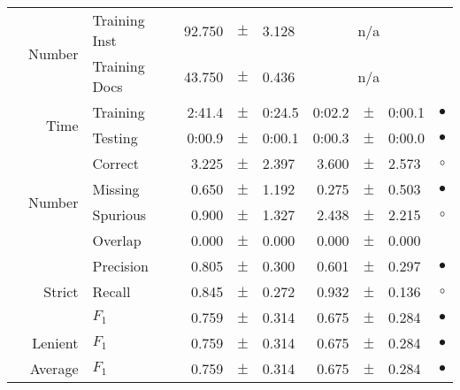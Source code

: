 \begin{longtable}{|r|r|l||rcl|rcl|c|}
\cline{2-10} & \multirow{2}{*}{    Number} &   Training Inst &      92.750 &  $\pm$  &       3.128 &    \multicolumn{3}{c|}{n/a}         &  \\
\cline{3-10} &                             &   Training Docs &      43.750 &  $\pm$  &       0.436 &    \multicolumn{3}{c|}{n/a}         &  \\
\cline{2-10} & \multirow{2}{*}{      Time} &        Training &      2:41.4 &  $\pm$  &      0:24.5 &      0:02.2 &  $\pm$  &      0:00.1 & $\bullet$ \\
\cline{3-10} &                             &         Testing &      0:00.9 &  $\pm$  &      0:00.1 &      0:00.3 &  $\pm$  &      0:00.0 & $\bullet$ \\
\hline
\pagebreak[4]
\hline
\hline
\multirow{11}{*}{\begin{sideways}amateur unit\end{sideways} }
             & \multirow{4}{*}{    Number} &         Correct &       3.225 &  $\pm$  &       2.397 &       3.600 &  $\pm$  &       2.573 & $\circ$ \\
\cline{3-10} &                             &         Missing &       0.650 &  $\pm$  &       1.192 &       0.275 &  $\pm$  &       0.503 & $\bullet$ \\
\cline{3-10} &                             &        Spurious &       0.900 &  $\pm$  &       1.327 &       2.438 &  $\pm$  &       2.215 & $\circ$ \\
\cline{3-10} &                             &         Overlap &       0.000 &  $\pm$  &       0.000 &       0.000 &  $\pm$  &       0.000 &  \\
\cline{2-10} & \multirow{3}{*}{    Strict} &       Precision &       0.805 &  $\pm$  &       0.300 &       0.601 &  $\pm$  &       0.297 & $\bullet$ \\
\cline{3-10} &                             &          Recall &       0.845 &  $\pm$  &       0.272 &       0.932 &  $\pm$  &       0.136 & $\circ$ \\
\cline{3-10} &                             &           $F_1$ &       0.759 &  $\pm$  &       0.314 &       0.675 &  $\pm$  &       0.284 & $\bullet$ \\
\cline{2-10} &                     Lenient &           $F_1$ &       0.759 &  $\pm$  &       0.314 &       0.675 &  $\pm$  &       0.284 & $\bullet$ \\
\cline{2-10} &                     Average &           $F_1$ &       0.759 &  $\pm$  &       0.314 &       0.675 &  $\pm$  &       0.284 & $\bullet$ \\

\end{longtable}
